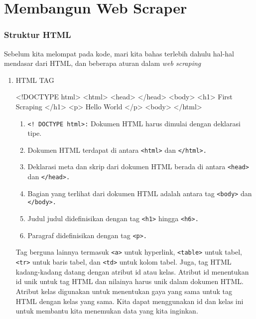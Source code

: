 \chapter{Membangun Web Scraper}


\subsection{Struktur HTML}

Sebelum kita melompat pada kode, mari kita bahas terlebih dahulu hal-hal mendasar dari HTML, dan beberapa aturan dalam \textit{web scraping}
\begin{enumerate}
\item HTML TAG
\begin{algorithm}
<!DOCTYPE html>  
<html>  
    <head>
    </head>
    <body>
        <h1> First Scraping </h1>
        <p> Hello World </p>
    <body>
</html>
\end{algorithm}
\begin{enumerate}

\item \verb|<! DOCTYPE html>:| Dokumen HTML harus dimulai dengan deklarasi tipe.
\item Dokumen HTML terdapat di antara \verb|<html>| dan \verb|</html>.|
\item Deklarasi meta dan skrip dari dokumen HTML berada di antara \verb|<head>| dan \verb|</head>.|
\item Bagian yang terlihat dari dokumen HTML adalah antara tag \verb|<body>| dan \verb|</body>.|
\item Judul judul didefinisikan dengan tag \verb|<h1>| hingga \verb|<h6>.|
\item Paragraf didefinisikan dengan tag \verb|<p>.|
\end{enumerate}

Tag berguna lainnya termasuk \verb|<a>| untuk hyperlink, \verb|<table>| untuk tabel, \verb|<tr>| untuk baris tabel, dan \verb|<td>| untuk kolom tabel. Juga, tag HTML kadang-kadang datang dengan atribut id atau kelas. Atribut id menentukan id unik untuk tag HTML dan nilainya harus unik dalam dokumen HTML. Atribut kelas digunakan untuk menentukan gaya yang sama untuk tag HTML dengan kelas yang sama. Kita dapat menggunakan id dan kelas ini untuk membantu kita menemukan data yang kita inginkan.


\end{enumerate}
